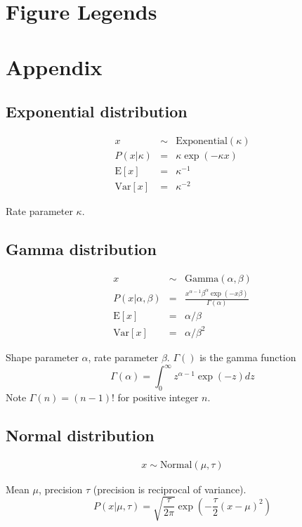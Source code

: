 \documentclass[10pt]{article}
\begin{document}
\clearpage
\section{Figure Legends}

\clearpage
\section{Appendix}

\subsection{Exponential distribution}

\begin{eqnarray*}
x & \sim & \mbox{Exponential}(\kappa) \\
P(x|\kappa) & = & \kappa \exp(-\kappa x) \\
\mbox{E}[x] & = & \kappa^{-1} \\
\mbox{Var}[x] & = & \kappa^{-2}
\end{eqnarray*}

Rate parameter $\kappa$.


\subsection{Gamma distribution}

\begin{eqnarray*}
x & \sim & \mbox{Gamma}(\alpha,\beta) \\
P(x|\alpha,\beta) & = & \frac{x^{\alpha-1} \beta^\alpha \exp(-x \beta)}{\Gamma(\alpha)} \\
\mbox{E}[x] & = & \alpha/\beta \\
\mbox{Var}[x] & = & \alpha/\beta^2
\end{eqnarray*}

Shape parameter $\alpha$, rate parameter $\beta$.
$\Gamma()$ is the gamma function
\[
\Gamma(\alpha) = \int_0^{\infty} z^{\alpha-1} \exp(-z) dz
\]
Note $\Gamma(n) = (n-1)!$ for positive integer $n$.

\subsection{Normal distribution}

\begin{eqnarray*}
x \sim \mbox{Normal}(\mu,\tau)
\end{eqnarray*}


Mean $\mu$, precision $\tau$ (precision is reciprocal of variance).
\[
P(x|\mu,\tau)
 = \sqrt{\frac{\tau}{2\pi}} \exp \left( -\frac{\tau}{2}(x-\mu)^2 \right)
\]
\end{document}

